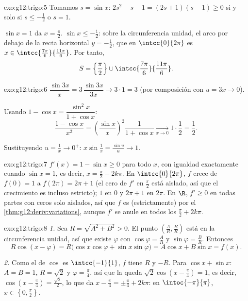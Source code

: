 \begin{solution}{exo:g12:trigo:5}
Tomamos $s = \sin x$: $2s^2 - s - 1 = (2s + 1)(s - 1) \geq 0$ si y solo si
$s \leq -\frac12$ o $s = 1$.

$\sin x = 1$ da $x = \frac\pi2$. $\sin x \leq -\frac12$: sobre la
circunferencia unidad, el arco por debajo de la recta horizontal
$y = -\frac12$, que en $\intcc{0}{2\pi}$ es
$x \in \intcc{\frac{7\pi}{6}}{\frac{11\pi}{6}}$. Por tanto,
\[
S = \left\{\frac{\pi}{2}\right\} \cup
\intcc{\frac{7\pi}{6}}{\frac{11\pi}{6}} .
\]
\end{solution}

\begin{solution}{exo:g12:trigo:6}
$\dfrac{\sin 3x}{x} = 3\,\dfrac{\sin 3x}{3x} \to 3 \cdot 1 = 3$ (por
composición con $u = 3x \to 0$).

Usando $1 - \cos x = \dfrac{\sin^2 x}{1 + \cos x}$:
\[
\frac{1 - \cos x}{x^2}
= \left(\frac{\sin x}{x}\right)^{\!2} \frac{1}{1 + \cos x}
\xrightarrow[x\to0]{} 1 \cdot \frac12 = \frac12 .
\]

Sustituyendo $u = \frac1x \to 0^+$:
$x \sin\frac1x = \frac{\sin u}{u} \to 1$.
\end{solution}

\begin{solution}{exo:g12:trigo:7}
$f'(x) = 1 - \sin x \geq 0$ para todo $x$, con igualdad exactamente cuando
$\sin x = 1$, es decir, $x = \frac\pi2 + 2k\pi$. En $\intcc{0}{2\pi}$, $f$
crece de $f(0) = 1$ a $f(2\pi) = 2\pi + 1$ (el cero de $f'$ en
$\frac{\pi}{2}$ está aislado, así que el crecimiento es incluso estricto);
 $1$ en $0$ y  $2\pi + 1$ en $2\pi$. En $\R$, $f' \geq 0$ en
todas partes con ceros solo aislados, así que $f$ es (estrictamente)
 por el \cref{thm:g12:deriv:variations}, aunque $f'$ se anule en
todos los $\frac\pi2 + 2k\pi$.
\end{solution}

\begin{solution}{exo:g12:trigo:8}
\emph{1.} Sea $R = \sqrt{A^2 + B^2} > 0$. El punto
$\left(\frac AR, \frac BR\right)$ está en la circunferencia unidad, así que
existe $\varphi$ con $\cos\varphi = \frac AR$ y $\sin\varphi = \frac BR$.
Entonces
\[
R\cos(x - \varphi) = R\bigl(\cos x\cos\varphi + \sin x \sin\varphi\bigr)
= A\cos x + B\sin x = f(x).
\]

\emph{2.} Como el  de $\cos$ es $\intcc{-1}{1}$, $f$ tiene 
$R$ y  $-R$. Para $\cos x + \sin x$: $A = B = 1$, $R = \sqrt2$ y
$\varphi = \frac\pi4$, así que la  queda
$\sqrt2\cos\left(x - \frac\pi4\right) = 1$, es decir,
$\cos\left(x - \frac\pi4\right) = \frac{\sqrt2}{2}$, lo que da
$x - \frac\pi4 = \pm\frac\pi4 + 2k\pi$: en $\intoc{-\pi}{\pi}$,
$x \in \left\{0, \frac\pi2\right\}$.
\end{solution}

